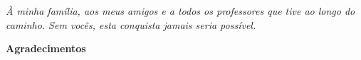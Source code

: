 \documentclass[12pt,openany]{report}
\begin{document}

\vspace*{\fill}
\begin{flushright}
\begin{minipage}{0.45\textwidth}
\itshape À minha família, aos meus amigos e a todos os professores que tive ao longo do caminho. Sem vocês, esta conquista jamais seria possível.
\end{minipage}
\end{flushright}
\newpage

\vspace*{2.5cm}
\begin{center}
    {\fontsize{18}{22}\selectfont\bfseries Agradecimentos\par}
\end{center}
\vspace{1.8cm}
\end{document}
